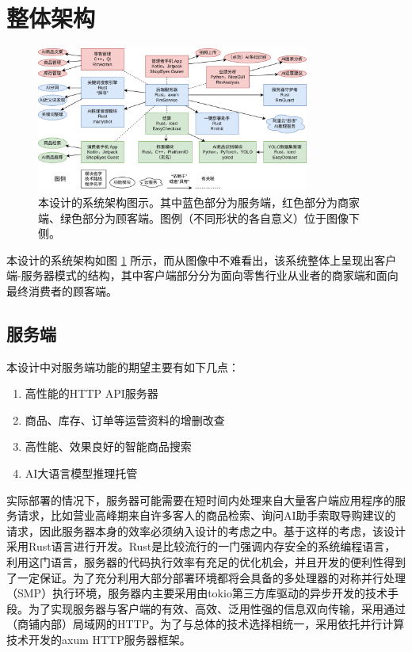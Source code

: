 \newpage
\section{整体架构}
\label{sec:architecture}

\begin{figure}[htbp]
	\centering
	\includegraphics[width=0.8\textwidth]{./imgs/structure2.png}
	\caption{本设计的系统架构图示。其中蓝色部分为服务端，红色部分为商家端、绿色部分为顾客端。图例（不同形状的各自意义）位于图像下侧。}
	\label{fig:structure2}
\end{figure}

本设计的系统架构如图 \ref{fig:structure2} 所示，而从图像中不难看出，该系统整体上呈现出客户端-服务器模式的结构，其中客户端部分分为面向零售行业从业者的商家端和面向最终消费者的顾客端。

\subsection{服务端}

本设计中对服务端功能的期望主要有如下几点：

\begin{enumerate}
    \item 高性能的HTTP API服务器
    \item 商品、库存、订单等运营资料的增删改查
    \item 高性能、效果良好的智能商品搜索
    \item AI大语言模型推理托管
\end{enumerate}

实际部署的情况下，服务器可能需要在短时间内处理来自大量客户端应用程序的服务请求，比如营业高峰期来自许多客人的商品检索、询问AI助手索取导购建议的请求，因此服务器本身的效率必须纳入设计的考虑之中。基于这样的考虑，该设计采用Rust语言进行开发。Rust是比较流行的一门强调内存安全的系统编程语言，利用这门语言，服务器的代码执行效率有充足的优化机会，并且开发的便利性得到了一定保证。为了充分利用大部分部署环境都将会具备的多处理器的对称并行处理（SMP）执行环境，服务器内主要采用由tokio第三方库驱动的异步开发的技术手段。为了实现服务器与客户端的有效、高效、泛用性强的信息双向传输，采用通过（商铺内部）局域网的HTTP。为了与总体的技术选择相统一，采用依托并行计算技术开发的axum HTTP服务器框架。

